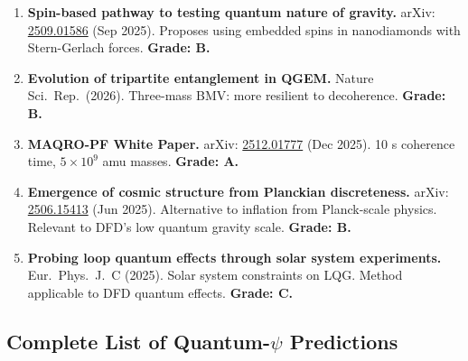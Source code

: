 \documentclass[11pt,a4paper]{article}
\begin{document}
\begin{enumerate}
\item \textbf{Spin-based pathway to testing quantum nature of gravity.} arXiv: \href{https://arxiv.org/abs/2509.01586}{2509.01586} (Sep 2025). Proposes using embedded spins in nanodiamonds with Stern-Gerlach forces. \textbf{Grade: B.}

\item \textbf{Evolution of tripartite entanglement in QGEM.} Nature Sci.\ Rep.\ (2026). Three-mass BMV: more resilient to decoherence. \textbf{Grade: B.}

\item \textbf{MAQRO-PF White Paper.} arXiv: \href{https://arxiv.org/abs/2512.01777}{2512.01777} (Dec 2025). 10 s coherence time, $5\times 10^9$ amu masses. \textbf{Grade: A.}

\item \textbf{Emergence of cosmic structure from Planckian discreteness.} arXiv: \href{https://arxiv.org/abs/2506.15413}{2506.15413} (Jun 2025). Alternative to inflation from Planck-scale physics. Relevant to DFD's low quantum gravity scale. \textbf{Grade: B.}

\item \textbf{Probing loop quantum effects through solar system experiments.} Eur.\ Phys.\ J.\ C (2025). Solar system constraints on LQG. Method applicable to DFD quantum effects. \textbf{Grade: C.}
\end{enumerate}

\subsection{Complete List of Quantum-$\psi$ Predictions}
\label{sec:QG-predictions}
\end{document}
